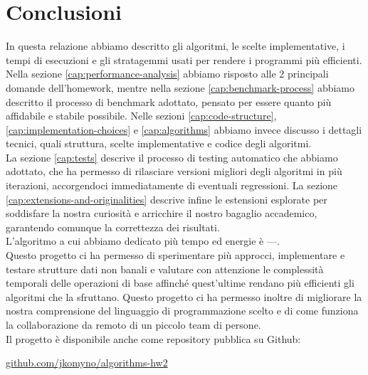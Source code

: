\section{Conclusioni}
\label{cap:conclusions}

In questa relazione abbiamo descritto gli algoritmi, le scelte implementative, i tempi di esecuzioni e gli stratagemmi usati per rendere i programmi più efficienti. \\

\noindent Nella sezione \ref{cap:performance-analysis} abbiamo risposto alle 2 principali domande dell'homework, mentre nella sezione \ref{cap:benchmark-process} abbiamo descritto il processo di benchmark adottato, pensato per essere quanto più affidabile e stabile possibile.
Nelle sezioni \ref{cap:code-structure}, \ref{cap:implementation-choices} e \ref{cap:algorithms} abbiamo invece discusso i dettagli tecnici, quali struttura, scelte implementative e codice degli algoritmi. \\

\noindent  La sezione \ref{cap:tests} descrive il processo di testing automatico che abbiamo adottato, che ha permesso di rilasciare versioni migliori degli algoritmi in più iterazioni, accorgendoci immediatamente di eventuali regressioni. La sezione \ref{cap:extensions-and-originalities} descrive infine le estensioni esplorate per soddisfare la nostra curiosità e arricchire il nostro bagaglio accademico, garantendo comunque la correttezza dei risultati. \\

\noindent L'algoritmo a cui abbiamo dedicato più tempo ed energie è ---.\\

\noindent Questo progetto ci ha permesso di sperimentare più approcci, implementare e testare strutture dati non banali e valutare con attenzione le complessità temporali delle operazioni di base affinché quest'ultime rendano più efficienti gli algoritmi che la sfruttano. Questo progetto ci ha permesso inoltre di migliorare la nostra comprensione del linguaggio di programmazione scelto e di come funziona la collaborazione da remoto di un piccolo team di persone. \\

\noindent Il progetto è disponibile anche come repository pubblica su Github:

\begin{center}
\href{https://github.com/jkomyno/algorithms-hw2}{github.com/jkomyno/algorithms-hw2}
\end{center}
